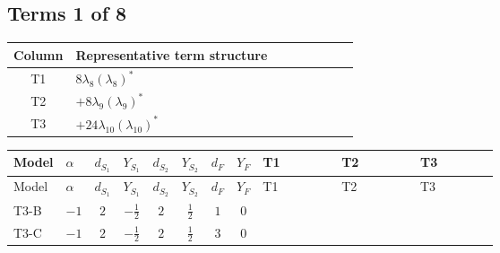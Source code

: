 \documentclass[8pt]{article}
\begin{document}
\begin{landscape}
\subsection*{Terms 1 of 8}
\begin{center}
\begin{tabular}{@{}c >{\raggedright\arraybackslash}p{0.82\linewidth}@{}}
\toprule
Column & Representative term structure \\
\midrule
T1 & \(\displaystyle 8 {\lambda_8} \left({\lambda_8}\right)^{*}\) \\
\midrule
T2 & \(\displaystyle +8 {\lambda_9} \left({\lambda_9}\right)^{*}\) \\
\midrule
T3 & \(\displaystyle +24 {\lambda_{10}} \left({\lambda_{10}}\right)^{*}\) \\
\midrule
\bottomrule
\end{tabular}
\end{center}
\smallskip
\tiny
\begin{longtable}{@{}llcccccc >{\raggedright\arraybackslash}p{0.21\linewidth} >{\raggedright\arraybackslash}p{0.21\linewidth} >{\raggedright\arraybackslash}p{0.21\linewidth}@{}}
\toprule
Model & $\alpha$ & $d_{S_1}$ & $Y_{S_1}$ & $d_{S_2}$ & $Y_{S_2}$ & $d_F$ & $Y_F$ & T1 & T2 & T3 \\
\midrule
\endfirsthead
\toprule
Model & $\alpha$ & $d_{S_1}$ & $Y_{S_1}$ & $d_{S_2}$ & $Y_{S_2}$ & $d_F$ & $Y_F$ & T1 & T2 & T3 \\
\midrule
\endhead
T3-B & $-1$ & $2$ & $-\frac{1}{2}$ & $2$ & $\frac{1}{2}$ & $1$ & $0$ & \scriptsize\adjustbox{max width=\linewidth}{$\begin{gathered} 8 {\lambda_8} \left({\lambda_8}\right)^{*}\end{gathered}$} & \scriptsize\adjustbox{max width=\linewidth}{$\begin{gathered} +8 {\lambda_9} \left({\lambda_9}\right)^{*}\end{gathered}$} & \scriptsize\adjustbox{max width=\linewidth}{$\begin{gathered} +24 {\lambda_{10}} \left({\lambda_{10}}\right)^{*}\end{gathered}$} \\
\midrule
T3-C & $-1$ & $2$ & $-\frac{1}{2}$ & $2$ & $\frac{1}{2}$ & $3$ & $0$ & \scriptsize\adjustbox{max width=\linewidth}{$\begin{gathered} 8 {\lambda_8} \left({\lambda_8}\right)^{*}\end{gathered}$} & \scriptsize\adjustbox{max width=\linewidth}{$\begin{gathered} +8 {\lambda_9} \left({\lambda_9}\right)^{*}\end{gathered}$} & \scriptsize\adjustbox{max width=\linewidth}{$\begin{gathered} +24 {\lambda_{10}} \left({\lambda_{10}}\right)^{*}\end{gathered}$} \\

\end{longtable}
\end{landscape}
\end{document}
